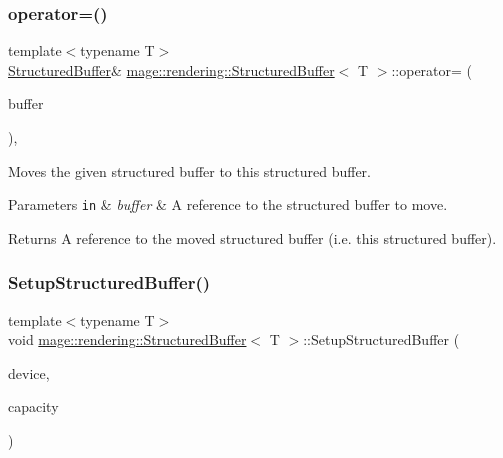 \subsubsection{\texorpdfstring{operator=()}{operator=()}\hspace{0.1cm}{\footnotesize\ttfamily [2/2]}}
{\footnotesize\ttfamily template$<$typename T$>$ \\
\mbox{\hyperlink{classmage_1_1rendering_1_1_structured_buffer}{Structured\+Buffer}}\& \mbox{\hyperlink{classmage_1_1rendering_1_1_structured_buffer}{mage\+::rendering\+::\+Structured\+Buffer}}$<$ T $>$\+::operator= (\begin{DoxyParamCaption}\item[{\mbox{\hyperlink{classmage_1_1rendering_1_1_structured_buffer}{Structured\+Buffer}}$<$ T $>$ \&\&}]{buffer }\end{DoxyParamCaption})\hspace{0.3cm}{\ttfamily [default]}, {\ttfamily [noexcept]}}

Moves the given structured buffer to this structured buffer.


\begin{DoxyParams}[1]{Parameters}
\mbox{\tt in}  & {\em buffer} & A reference to the structured buffer to move. \\
\hline
\end{DoxyParams}
\begin{DoxyReturn}{Returns}
A reference to the moved structured buffer (i.\+e. this structured buffer). 
\end{DoxyReturn}
\mbox{\label{classmage_1_1rendering_1_1_structured_buffer_af21ae30edd673946d224dac2b6149632}} 
\subsubsection{\texorpdfstring{Setup\+Structured\+Buffer()}{SetupStructuredBuffer()}}
{\footnotesize\ttfamily template$<$typename T$>$ \\
void \mbox{\hyperlink{classmage_1_1rendering_1_1_structured_buffer}{mage\+::rendering\+::\+Structured\+Buffer}}$<$ T $>$\+::Setup\+Structured\+Buffer (\begin{DoxyParamCaption}\item[{I\+D3\+D11\+Device \&}]{device,  }\item[{std\+::size\+\_\+t}]{capacity }\end{DoxyParamCaption})\hspace{0.3cm}{\ttfamily [private]}}

